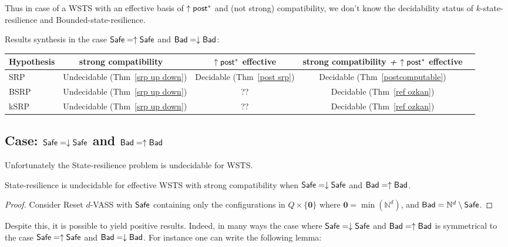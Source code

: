 Thus in case of a WSTS with an effective basis of $\uparrow \textsf{post}^*$ and (not strong) compatibility, we don't know the decidability status of {\sc $k$-state-resilience} and 
{\sc Bounded-state-resilience}. 


Results synthesis in the case $\textsf{Safe} = \uparrow \textsf{Safe}$ and $\textsf{Bad} = \downarrow \textsf{Bad}$:


\begin{center}
\begin{tabular}{ | l | c | c | c | c |}
\hline  Hypothesis & strong %
			compatibility ~ & $\uparrow \textsf{post}^*$ effective 
			& strong %
					compatibility \textit{+} $\uparrow \textsf{post}^*$ effective \\ \hline
   SRP & Undecidable (Thm~\ref{srp up down}) & Decidable (Thm~\ref{post srp})  & Decidable (Thm~\ref{postcomputable})\\ \hline
   BSRP & Undecidable (Thm~\ref{srp up down}) &  ??  & Decidable (Thm~\ref{ref ozkan}) \\ \hline
      kSRP & Undecidable (Thm~\ref{srp up down}) & ?? & Decidable (Thm~\ref{ref ozkan}) \\ \hline
 \end{tabular}
\end{center}


\subsection{Case: $\textsf{Safe} = \downarrow \textsf{Safe}$ and $\textsf{Bad} = \uparrow \textsf{Bad}$}



Unfortunately the {\sc State-resilience} problem is undecidable for WSTS.

\begin{theorem}\label{srp down up}
{\sc State-resilience} is undecidable for effective WSTS with  strong  compatibility 
when
$\textsf{Safe}=\downarrow \textsf{Safe}$
and $\textsf{Bad}=\uparrow \textsf{Bad}$.
\end{theorem}

\begin{proof}
Consider Reset $d$-VASS
with $\textsf{Safe}$ %
	containing only the
		configurations in $Q \times \{ \textbf{0} \}$
	where $\textbf{0} = \min(\mathbb{N}^d)$, %
and $\textsf{Bad} = \mathbb{N}^d \setminus \textsf{Safe}$.

\end{proof}


Despite this, it is possible to yield positive results. Indeed, in many ways the case where $\textsf{Safe} = \downarrow \textsf{Safe}$ and $\textsf{Bad} = \uparrow \textsf{Bad}$
is symmetrical to the case $\textsf{Safe} = \uparrow \textsf{Safe}$ and $\textsf{Bad} = \downarrow \textsf{Bad}$.
%
For instance one can write the following lemma:

